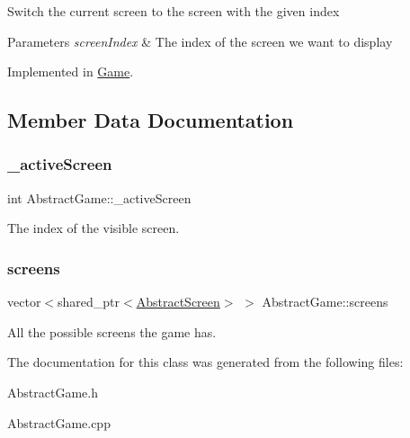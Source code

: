 Switch the current screen to the screen with the given index 


\begin{DoxyParams}{Parameters}
{\em screen\+Index} & The index of the screen we want to display\\
\hline
\end{DoxyParams}


Implemented in \mbox{\hyperlink{class_game_a0e1dd146112c54290e11d3e5f0a36fdd}{Game}}.



\subsection{Member Data Documentation}
\mbox{\label{class_abstract_game_ab5e3089bdd788319c1a240992018c355}} 
\subsubsection{\texorpdfstring{\+\_\+active\+Screen}{\_activeScreen}}
{\footnotesize\ttfamily int Abstract\+Game\+::\+\_\+active\+Screen\hspace{0.3cm}{\ttfamily [protected]}}



The index of the visible screen. 

\mbox{\label{class_abstract_game_add5999d1c4190a9ad25dfdb51327720b}} 
\subsubsection{\texorpdfstring{screens}{screens}}
{\footnotesize\ttfamily vector$<$shared\+\_\+ptr$<$\mbox{\hyperlink{class_abstract_screen}{Abstract\+Screen}}$>$ $>$ Abstract\+Game\+::screens}



All the possible screens the game has. 



The documentation for this class was generated from the following files\+:\begin{DoxyCompactItemize}
\item 
Abstract\+Game.\+h\item 
Abstract\+Game.\+cpp\end{DoxyCompactItemize}
